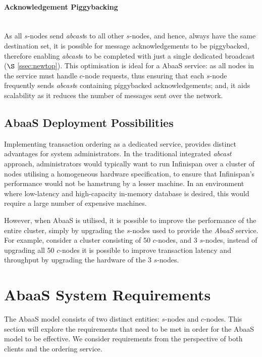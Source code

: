 	\paragraph{Acknowledgement Piggybacking} \hspace{0pt} \\
	As all $s$-nodes send \emph{abcast}s to all other $s$-nodes, and hence, always have the same destination set, it is possible for message acknowledgements to be piggybacked, therefore enabling \emph{abcast}s to be completed with just a single dedicated broadcast ($\S$ \ref{ssec:newtop}).  This optimisation is ideal for a \textsf{AbaaS} service: as all nodes in the service must handle $c$-node requests, thus ensuring that each $s$-node frequently sends \emph{abcast}s containing piggybacked acknowledgements; and, it aids scalability as it reduces the number of messages sent over the network. 
	
	\subsection{AbaaS Deployment Possibilities}
	Implementing transaction ordering as a dedicated service, provides distinct advantages for system administrators.  In the traditional integrated \emph{abcast} approach, administrators would typically want to run Infinispan over a cluster of nodes utilising a homogeneous hardware specification, to ensure that Infinispan's performance would not be hamstrung by a lesser machine.  In an environment where low-latency and high-capacity in-memory database is desired, this would require a large number of expensive machines.  
	
	However, when AbaaS is utilised, it is possible to improve the performance of the entire cluster, simply by upgrading the $s$-nodes used to provide the \emph{AbaaS} service.  For example, consider a cluster consisting of 50 $c$-nodes, and 3 $s$-nodes, instead of upgrading all 50 $c$-nodes it is possible to improve transaction latency and throughput by upgrading the hardware of the 3 $s$-nodes.  
	
\section{AbaaS System Requirements}
The \textsf{AbaaS} model consists of two distinct entities: $s$-nodes and $c$-nodes.  This section will explore the requirements that need to be met in order for the \textsf{AbaaS} model to be effective.  We consider requirements from the perspective of both clients and the ordering service.

